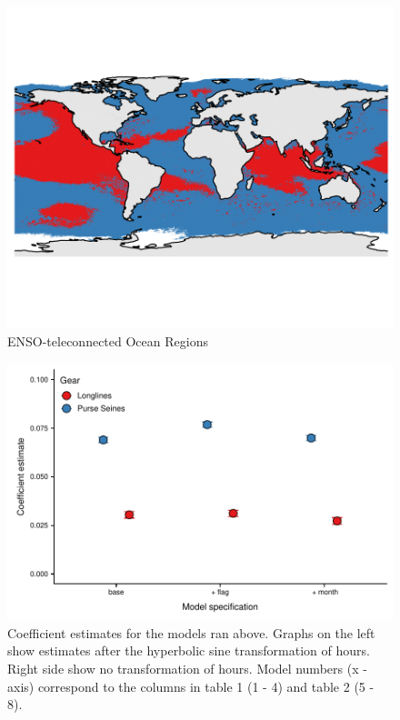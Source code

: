 \documentclass[11pt]{article}
\begin{document}
\begin{figure}
\centering
\includegraphics{img/teleconnected_3months.pdf}
\caption{ENSO-teleconnected Ocean Regions}
\end{figure}

\clearpage



\clearpage

\begin{figure}
\centering
\includegraphics{img/coef_estimates.pdf}
\caption{Coefficient estimates for the models ran above. Graphs on the left show estimates after the hyperbolic sine transformation of hours. Right side show no transformation of hours.
 Model numbers (x - axis) correspond to the columns in table 1 (1 - 4) and table 2 (5 - 8).}
\end{figure}
\end{document}
